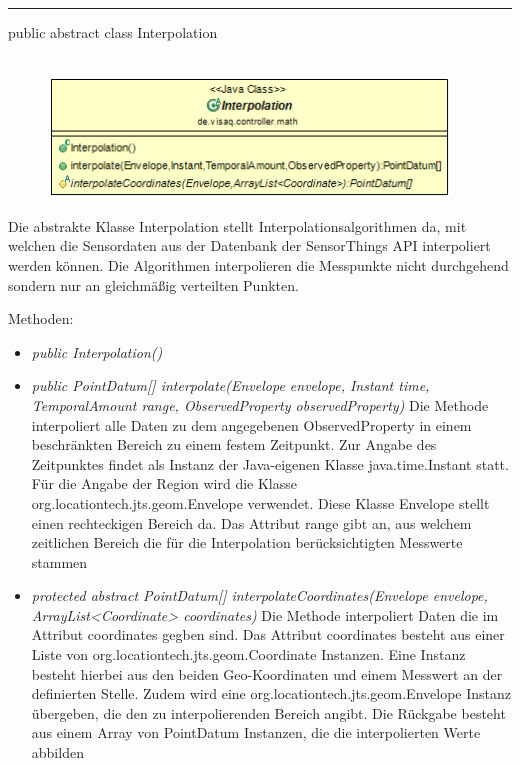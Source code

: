 \rule{\textwidth}{0.4pt}
public abstract class Interpolation
\\\\
\begin{minipage}{0.5\textwidth}
    \begin{figure}[H]
        {\centering\includegraphics[width=0.95\textwidth]{media/backend/controller/classes/Interpolation.png}}
    \end{figure}
    \end{minipage} \hfill
\begin{minipage}{0.5\textwidth}
    Die abstrakte Klasse Interpolation stellt Interpolationsalgorithmen da, mit welchen die Sensordaten aus der Datenbank der \gls{SensorThings API} interpoliert werden können.
    Die Algorithmen interpolieren die Messpunkte nicht durchgehend sondern nur an gleichmäßig verteilten Punkten.
\end{minipage}

Methoden:
\begin{itemize}
    \item \emph{public Interpolation()}
    \item \emph{public PointDatum[] interpolate(Envelope envelope, Instant time, TemporalAmount range, ObservedProperty observedProperty)}
    Die Methode interpoliert alle Daten zu dem angegebenen ObservedProperty in einem beschränkten Bereich zu einem festem Zeitpunkt.
    Zur Angabe des Zeitpunktes findet als Instanz der Java-eigenen Klasse java.time.Instant statt.
    Für die Angabe der Region wird die Klasse org.locationtech.jts.geom.Envelope verwendet.
    Diese Klasse Envelope stellt einen rechteckigen Bereich da.
    Das Attribut range gibt an, aus welchem zeitlichen Bereich die für die Interpolation berücksichtigten Messwerte stammen
    \item \emph{protected abstract PointDatum[] interpolateCoordinates(Envelope envelope, ArrayList<Coordinate> coordinates)}
    Die Methode interpoliert Daten die im Attribut coordinates gegben sind.
    Das Attribut coordinates besteht aus einer Liste von org.locationtech.jts.geom.Coordinate Instanzen.
    Eine Instanz besteht hierbei aus den beiden Geo-Koordinaten und einem Messwert an der definierten Stelle.
    Zudem wird eine org.locationtech.jts.geom.Envelope Instanz übergeben, die den zu interpolierenden Bereich angibt.
    Die Rückgabe besteht aus einem Array von PointDatum Instanzen, die die interpolierten Werte abbilden
\end{itemize}

